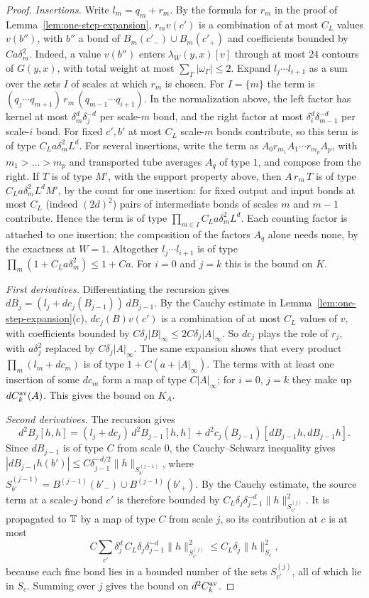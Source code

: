 \begin{proof}
\emph{Insertions.} Write $l_m=q_m+r_m$. By the formula for $r_m$ in the proof of Lemma~\ref{lem:one-step-expansion}, $r_mv(c')$ is a combination of at most $C_L$ values $v(b'')$, with $b''$ a bond of $B_m(c'_-)\cup B_m(c'_+)$ and coefficients bounded by $Ca\delta_m^2$. Indeed, a value $v(b'')$ enters $\lambda_W(y,x)[v]$ through at most $24$ contours of $G(y,x)$, with total weight at most $\sum_\Gamma|\omega_\Gamma|\le2$. Expand $l_j\cdots l_{i+1}$ as a sum over the sets $I$ of scales at which $r_m$ is chosen. For $I=\{m\}$ the term is $(q_j\cdots q_{m+1})\,r_m\,(q_{m-1}\cdots q_{i+1})$. In the normalization above, the left factor has kernel at most $\delta_m^d\delta_j^{-d}$ per scale-$m$ bond, and the right factor at most $\delta_i^d\delta_{m-1}^{-d}$ per scale-$i$ bond. For fixed $c',b'$ at most $C_L$ scale-$m$ bonds contribute, so this term is of type $C_La\delta_m^2L^d$. For several insertions, write the term as $A_0r_{m_1}A_1\cdots r_{m_p}A_p$, with $m_1>\dots>m_p$ and transported tube averages $A_q$ of type $1$, and compose from the right. If $T$ is of type $M'$, with the support property above, then $A\,r_m\,T$ is of type $C_La\delta_m^2L^dM'$, by the count for one insertion: for fixed output and input bonds at most $C_L$ (indeed $(2d)^2$) pairs of intermediate bonds of scales $m$ and $m-1$ contribute. Hence the term is of type $\prod_{m\in I}C_La\delta_m^2L^d$. Each counting factor is attached to one insertion; the composition of the factors $A_q$ alone needs none, by the exactness at $W=1$. Altogether $l_j\cdots l_{i+1}$ is of type $\prod_m(1+C_La\delta_m^2)\le1+Ca$. For $i=0$ and $j=k$ this is the bound on $K$.

\emph{First derivatives.} Differentiating the recursion gives $dB_j=(l_j+dc_j(B_{j-1}))\,dB_{j-1}$. By the Cauchy estimate in Lemma~\ref{lem:one-step-expansion}(c), $dc_j(B)v(c')$ is a combination of at most $C_L$ values of $v$, with coefficients bounded by $C\delta_j|B|_\infty\le2C\delta_j|A|_\infty$. So $dc_j$ plays the role of $r_j$, with $a\delta_j^2$ replaced by $C\delta_j|A|_\infty$. The same expansion shows that every product $\prod_m(l_m+dc_m)$ is of type $1+C(a+|A|_\infty)$. The terms with at least one insertion of some $dc_m$ form a map of type $C|A|_\infty$; for $i=0$, $j=k$ they make up $dC^{\rm av}_k(A)$. This gives the bound on $K_A$.

\emph{Second derivatives.} The recursion gives
\[
d^2B_j[h,h]=(l_j+dc_j)\,d^2B_{j-1}[h,h]+d^2c_j(B_{j-1})[dB_{j-1}h,dB_{j-1}h].
\]
Since $dB_{j-1}$ is of type $C$ from scale $0$, the Cauchy--Schwarz inequality gives $|dB_{j-1}h(b')|\le C\delta_{j-1}^{-d/2}\|h\|_{S^{(j-1)}_{b'}}$, where $S^{(j-1)}_{b'}=B^{(j-1)}(b'_-)\cup B^{(j-1)}(b'_+)$. By the Cauchy estimate, the source term at a scale-$j$ bond $c'$ is therefore bounded by $C_L\delta_j\delta_{j-1}^{-d}\|h\|^2_{S^{(j)}_{c'}}$. It is propagated to $\mathbb T$ by a map of type $C$ from scale $j$, so its contribution at $c$ is at most
\[
C\sum_{c'}\delta_j^d\,C_L\delta_j\delta_{j-1}^{-d}\|h\|^2_{S^{(j)}_{c'}}\le C_L\delta_j\|h\|^2_{S_c},
\]
because each fine bond lies in a bounded number of the sets $S^{(j)}_{c'}$, all of which lie in $S_c$. Summing over $j$ gives the bound on $d^2C^{\rm av}_k$.


\end{proof}
